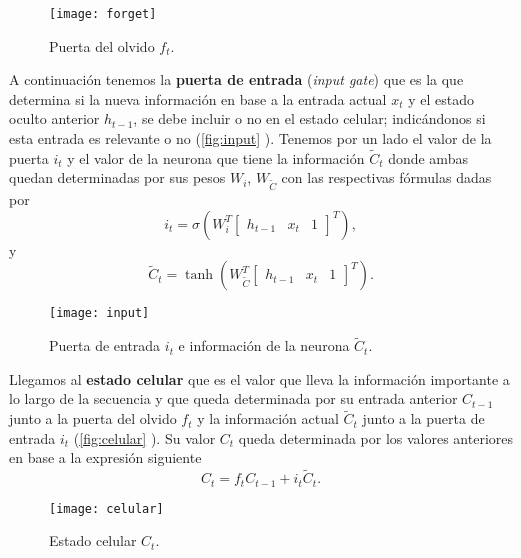 \begin{figure}[htpb]
  \centering
  \texttt{[image: forget]}
  \caption{Puerta del olvido $f_t$.}
  \label{fig:forget}
\end{figure}

A continuación tenemos la \textbf{puerta de entrada} (\emph{input gate}) que es la que determina si la nueva información en base a la entrada actual $x_t$ y el estado oculto anterior $h_{t-1}$, se debe incluir o no en el estado celular; indicándonos si esta entrada es relevante o no (\autoref{fig:input} \cite{christopher2015lstm}). Tenemos por un lado el valor de la puerta $i_t$ y el valor de la neurona que tiene la información $\widetilde{C}_t$ donde ambas quedan determinadas por sus pesos $W_i$, $W_{\widetilde{C}}$ con las respectivas fórmulas dadas por
\begin{equation*}
  i_t = \sigma\left(W_i^T \begin{bmatrix} h_{t-1} & x_t & 1 \end{bmatrix}^T\right),
  \label{eq:input1}
\end{equation*}
y
\begin{equation*}
  \widetilde{C}_t = \tanh\left(W_{\widetilde{C}}^T \begin{bmatrix} h_{t-1} & x_t & 1 \end{bmatrix}^T\right).
  \label{eq:input2}
\end{equation*}

\begin{figure}[htpb]
  \centering
  \texttt{[image: input]}
  \caption{Puerta de entrada $i_t$ e información de la neurona $\widetilde{C}_t$.}
  \label{fig:input}
\end{figure}

Llegamos al \textbf{estado celular} que es el valor que lleva la información importante a lo largo de la secuencia y que queda determinada por su entrada anterior $C_{t-1}$ junto a la puerta del olvido $f_t$ y la información actual $\widetilde{C}_t$ junto a la puerta de entrada $i_t$ (\autoref{fig:celular} \cite{christopher2015lstm}). Su valor $C_t$ queda determinada por los valores anteriores en base a la expresión siguiente
\begin{equation*}
  C_t = f_t C_{t-1} + i_t \widetilde{C}_t.
  \label{eq:celular}
\end{equation*}

\begin{figure}[htpb]
  \centering
  \texttt{[image: celular]}
  \caption{Estado celular $C_t$.}
  \label{fig:celular}
\end{figure}

